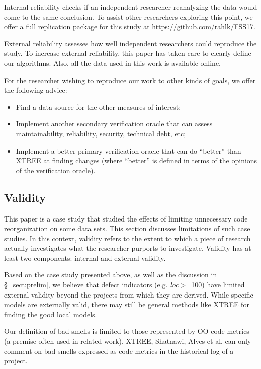 \documentclass[sigconf, proceedings, 9pt]{acmart}
\newcommand{\tion}[1]{\S~\ref{sect:#1}}
\begin{document}
Internal reliability checks if an independent researcher
reanalyzing the data would come to the same conclusion.
To assist other researchers exploring this point, we offer a full 
replication package for this study at
https://github.com/rahlk/FSS17.

External reliability assesses how well independent researchers
could reproduce the study. To increase external
reliability, this paper has taken care to clearly define our
algorithms. Also, all the data used in this work is available
online.

For the researcher wishing to reproduce our work to other kinds of goals, 
we offer the following advice:

\begin{itemize}
\item Find a data source for the other measures of interest;
\item Implement another secondary verification oracle that can assess 
maintainability, reliability, security, technical debt, etc;
\item Implement a better primary verification oracle that can do ``better'' 
than XTREE at finding changes (where ``better'' is defined in terms
of the opinions of the verification oracle). 
\end{itemize}


\subsection{Validity}

This paper is a case study that studied the effects of  limiting 
unnecessary code reorganization on some data sets. This section discusses 
limitations of such case studies. In this context, validity refers to the 
extent to which a piece of research actually
investigates what the researcher purports to investigate.
Validity has at least two components: internal and
external validity.


Based on the case study presented above,
as well as the discussion in \tion{prelim},
we believe that defect indicators (e.g. \mbox{{\em loc}$>$ 100})
have limited external validity beyond the projects from which they are 
derived.
While specific models are externally valid,
there may still be general methods like XTREE for finding the good local 
models.

Our definition of bad smells is limited to those represented by OO code 
metrics (a premise often used in related work).
XTREE, Shatnawi, Alves et al. can  only comment
on bad smells   expressed as code metrics
in the historical log of a project.
\end{document}
